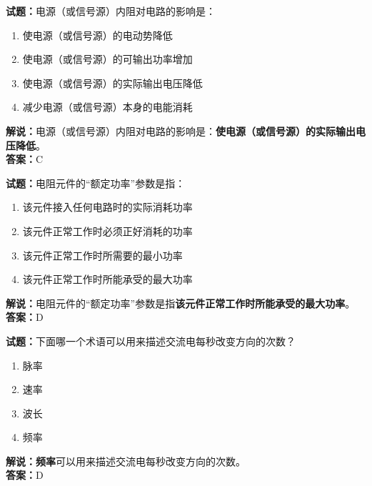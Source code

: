 \documentclass{ctexbook}
\begin{document}
\vspace{\baselineskip}

\noindent\textbf{试题：}电源（或信号源）内阻对电路的影响是：

\begin{enumerate}[leftmargin=3em]
  \item 使电源（或信号源）的电动势降低
  \item 使电源（或信号源）的可输出功率增加
  \item 使电源（或信号源）的实际输出电压降低
  \item 减少电源（或信号源）本身的电能消耗
\end{enumerate}

\noindent\textbf{解说：}电源（或信号源）内阻对电路的影响是：\textbf{使电源（或信号源）的实际输出电压降低}。\\\noindent\textbf{答案：}C

\vspace{\baselineskip}

\noindent\textbf{试题：}电阻元件的“额定功率”参数是指：

\begin{enumerate}[leftmargin=3em]
  \item 该元件接入任何电路时的实际消耗功率
  \item 该元件正常工作时必须正好消耗的功率
  \item 该元件正常工作时所需要的最小功率
  \item 该元件正常工作时所能承受的最大功率
\end{enumerate}

\noindent\textbf{解说：}电阻元件的“额定功率”参数是指\textbf{该元件正常工作时所能承受的最大功率}。\\\noindent\textbf{答案：}D

\vspace{\baselineskip}

\noindent\textbf{试题：}下面哪一个术语可以用来描述交流电每秒改变方向的次数？

\begin{enumerate}[leftmargin=3em]
  \item 脉率
  \item 速率
  \item 波长
  \item 频率
\end{enumerate}

\noindent\textbf{解说：}\textbf{频率}可以用来描述交流电每秒改变方向的次数。\\
\noindent\textbf{答案：}D
\end{document}
